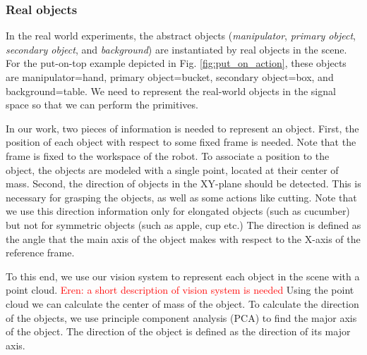 \subsubsection{Real objects}
In the real world experiments, the abstract objects (\textit{manipulator}, \textit{primary object}, \textit{secondary object}, and \textit{background})
are instantiated by real objects in the scene.
For the put-on-top example depicted in Fig. \ref{fig:put_on_action},
these objects are manipulator=hand, primary object=bucket, secondary object=box, and background=table.
We need to represent the real-world objects in the signal space so that we can perform the primitives.

In our work, two pieces of information is needed to represent an object.
First, the position of each object with respect to some fixed frame is needed.
Note that the frame is fixed to the workspace of the robot.
To associate a position to the object, the objects are modeled with a single point, located at their center of mass.
Second, the direction of objects in the XY-plane should be detected.
This is necessary for grasping the objects, as well as some actions like cutting.
Note that we use this direction information only for elongated objects (such as cucumber) but not for symmetric objects (such as apple, cup etc.)
The direction is defined as the angle that the main axis of the object makes with respect to the X-axis of the reference frame.

To this end, we use our vision system to represent each object in the scene with a point cloud.
\textcolor{red}{Eren: a short description of vision system is needed}
Using the point cloud we can calculate the center of mass of the object.
To calculate the direction of the objects, we use principle component analysis (PCA) to find the major axis of the object.
The direction of the object is defined as the direction of its major axis.

